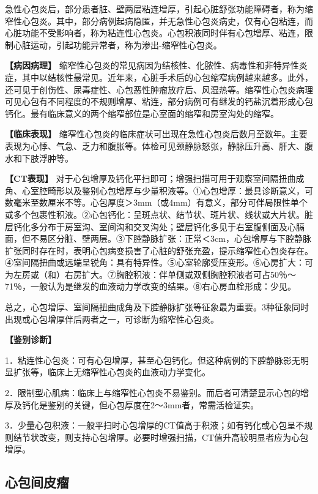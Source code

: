 急性心包炎后，部分患者脏、壁两层粘连增厚，引起心脏舒张功能障碍者，称为缩窄性心包炎。其中，部分病例起病隐匿，并无急性心包炎病史，仅有心包粘连，而心脏功能不受影响者，称为粘连性心包炎。心包积液同时伴有心包增厚、粘连，限制心脏运动，引起功能异常者，称为渗出-缩窄性心包炎。

\textbf{【病因病理】}
缩窄性心包炎的常见病因为结核性、化脓性、病毒性和非特异性炎症，其中以结核性最常见。近年来，心脏手术后的心包缩窄病例越来越多。此外，还可见于创伤性、尿毒症性、心包恶性肿瘤放疗后、风湿热等。缩窄性心包炎病理可见心包有不同程度的不规则增厚、粘连，部分病例可有继发的钙盐沉着形成心包钙化。最有临床意义的两个缩窄部位是心室面的缩窄和房室沟处的缩窄。

\textbf{【临床表现】}
缩窄性心包炎的临床症状可出现在急性心包炎后数月至数年。主要表现为心悸、气急、乏力和腹胀等。体检可见颈静脉怒张，静脉压升高、肝大、腹水和下肢浮肿等。

\textbf{【CT表现】}
对于心包增厚及钙化平扫即可；增强扫描可用于观察室间隔扭曲成角、心室腔畸形以及鉴别心包增厚与少量积液等。①心包增厚：最具诊断意义，可数毫米至数厘米不等。心包厚度＞3mm（或4mm）有意义，部分可伴局限性单个或多个包裹性积液。②心包钙化：呈斑点状、结节状、斑片状、线状或大片状。脏层钙化多分布于房室沟、室间沟和交叉沟处；壁层钙化多见于右室腹侧面及心膈面，但不易区分脏、壁两层。③下腔静脉扩张：正常＜3cm，心包增厚与下腔静脉扩张同时存在时，表明心包病变损害了心脏的舒张充盈，提示缩窄性心包炎存在。④室间隔扭曲或远端呈锐角：具有特异性。⑤心室轮廓受压变形。⑥心房扩大：可为左房或（和）右房扩大。⑦胸腔积液：伴单侧或双侧胸腔积液者可占50％～71％，一般认为是继发的血液动力学改变的结果。⑧右心房血栓形成：少见。

总之，心包增厚、室间隔扭曲成角及下腔静脉扩张等征象最为重要。3种征象同时出现或心包增厚伴后两者之一，可诊断为缩窄性心包炎。

\textbf{【鉴别诊断】}

1．粘连性心包炎：可有心包增厚，甚至心包钙化。但这种病例的下腔静脉影无明显扩张等，临床上无缩窄性心包炎的血液动力学变化。

2．限制型心肌病：临床上与缩窄性心包炎不易鉴别。而后者可清楚显示心包的增厚及钙化是鉴别的关键，但心包厚度在2～3mm者，常需活检证实。

3．少量心包积液：一般平扫时心包增厚的CT值高于积液；如有钙化或心包呈不规则结节状改变，则支持心包增厚。必要时增强扫描，CT值升高较明显者应为心包增厚。

\subsection{心包间皮瘤}

